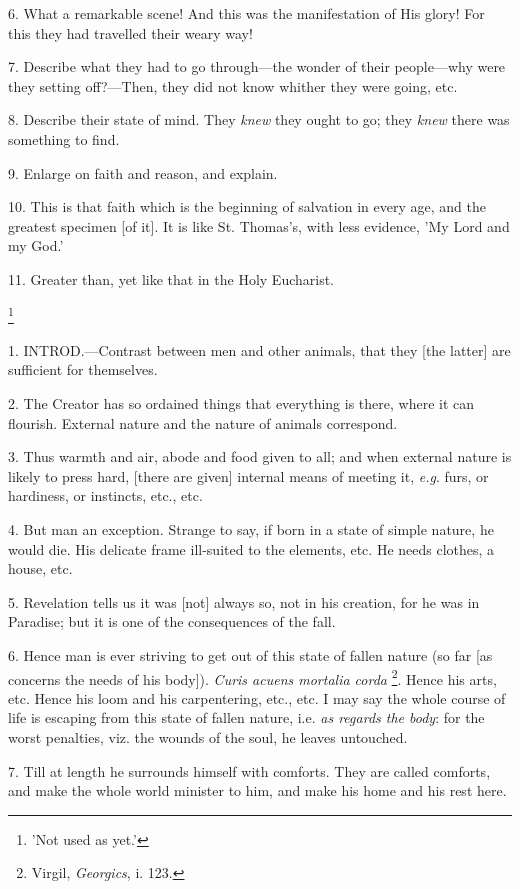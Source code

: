 6. What a remarkable scene! And this was the manifestation of His glory! For this they had travelled their weary
way!

7. Describe what they had to go through—the
wonder of their people—why were they setting off?—Then, they did
not know whither they were going, etc.

8. Describe their state of mind. They \emph{knew}
they ought to go; they \emph{knew} there was something to find.

9. Enlarge on faith and reason, and explain.

10. This is that faith which is the beginning of
salvation in every age, and the greatest specimen [of it]. It is like
St. Thomas's, with less evidence, 'My Lord and my God.'

11. Greater than, yet like that in the Holy
Eucharist.


\footnote{'Not used as yet.'}

1. INTROD.—Contrast
between men and other animals, that they [the latter] are sufficient
for themselves.

2. The Creator has so ordained things that
everything is there, where it can flourish. External nature and the
nature of animals correspond.

3. Thus warmth and air, abode and food given to
all; and when external nature is likely to press hard, [there are
given] internal means of meeting it, \emph{e.g}. furs, or hardiness,
or instincts, etc., etc.

4. But man an exception. Strange to say, if born
in a state of simple nature, he would die. His delicate frame
ill-suited to the elements, etc. He needs clothes, a house, etc.

5. Revelation tells us it was [not] always so,
not in his creation, for he was in Paradise; but it is one of the
consequences of the fall.

6. Hence man is ever striving to get out of this
state of fallen nature (so far [as concerns the needs of his body]). \emph{Curis
acuens mortalia corda} \footnote{Virgil, \emph{Georgics},
i. 123.}.
Hence his arts, etc. Hence his loom and his carpentering, etc., etc. I
may say the whole course of life is escaping from this state of fallen
nature, i.e. \emph{as regards the body}: for the worst penalties, viz.
the wounds of the soul, he leaves untouched.

7. Till at length he surrounds himself with
comforts. They are called comforts, and make the whole world minister
to him, and make his home and his rest here.

